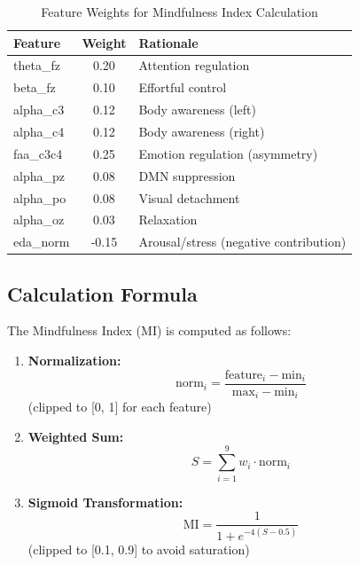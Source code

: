 \begin{table}[h!]
\centering
\caption{Feature Weights for Mindfulness Index Calculation}
\begin{tabular}{|l|c|l|}
\hline
\textbf{Feature} & \textbf{Weight} & \textbf{Rationale} \\
\hline
theta\_fz & 0.20 & Attention regulation \\
beta\_fz & 0.10 & Effortful control \\
alpha\_c3 & 0.12 & Body awareness (left) \\
alpha\_c4 & 0.12 & Body awareness (right) \\
faa\_c3c4 & 0.25 & Emotion regulation (asymmetry) \\
alpha\_pz & 0.08 & DMN suppression \\
alpha\_po & 0.08 & Visual detachment \\
alpha\_oz & 0.03 & Relaxation \\
eda\_norm & -0.15 & Arousal/stress (negative contribution) \\
\hline
\end{tabular}
\end{table}

\subsection*{Calculation Formula}
The Mindfulness Index (MI) is computed as follows:

\begin{enumerate}
    \item \textbf{Normalization:}
    \[
        \text{norm}_i = \frac{\text{feature}_i - \text{min}_i}{\text{max}_i - \text{min}_i}
    \]
    (clipped to [0, 1] for each feature)
    \item \textbf{Weighted Sum:}
    \[
        S = \sum_{i=1}^9 w_i \cdot \text{norm}_i
    \]
    \item \textbf{Sigmoid Transformation:}
    \[
        \text{MI} = \frac{1}{1 + e^{-4(S - 0.5)}}
    \]
    (clipped to [0.1, 0.9] to avoid saturation)
\end{enumerate}

